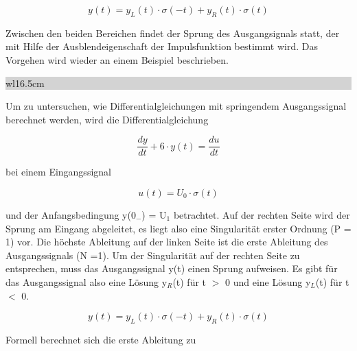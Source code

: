 \begin{equation}\label{eq:hundredseven}
y\left(t\right)=y_{L} \left(t\right)\cdot \sigma \left(-t\right)+y_{R} \left(t\right)\cdot \sigma \left(t\right)
\end{equation}

\noindent Zwischen den beiden Bereichen findet der Sprung des Ausgangsignals statt, der mit Hilfe der Ausblendeigenschaft der Impulsfunktion bestimmt wird. Das Vorgehen wird wieder an einem Beispiel beschrieben.\bigskip

\noindent
\colorbox{lightgray}{%
%
\renewcommand\arraystretch{0.6}%
\begin{tabular}{ wl{16.5cm} }
{\selectfont{
Beispiel: Lineare Differentialgleichung und stetiges Ausgangssignal}}
\end{tabular}%
}\bigskip

\noindent Um zu untersuchen, wie Differentialgleichungen mit springendem Ausgangssignal berechnet werden, wird die Differentialgleichung

\begin{equation}\label{eq:hundredeight}
\frac{dy}{dt} +6\cdot y\left(t\right)=\frac{du}{dt}
\end{equation}

\noindent bei einem Eingangssignal 

\begin{equation}\label{eq:hundrednine}
u\left(t\right)=U_{0} \cdot \sigma \left(t\right)
\end{equation}

\noindent und der Anfangsbedingung y(0${}_{-}$) = U${}_{1}$ betrachtet. Auf der rechten Seite wird der Sprung am Eingang abgeleitet, es liegt also eine Singularit\"{a}t erster Ordnung (P = 1) vor. Die h\"{o}chste Ableitung auf der linken Seite ist die erste Ableitung des Ausgangssignals (N =1). Um der Singularit\"{a}t auf der rechten Seite zu entsprechen, muss das Ausgangssignal y(t) einen Sprung aufweisen. Es gibt f\"{u}r das Ausgangssignal also eine L\"{o}sung y${}_{R}$(t) f\"{u}r t $\mathrm{>}$ 0 und eine L\"{o}sung y${}_{L}$(t) f\"{u}r t $\mathrm{<}$ 0. 

\begin{equation}\label{eq:hundredten}
y\left(t\right)=y_{L} \left(t\right)\cdot \sigma \left(-t\right)+y_{R} \left(t\right)\cdot \sigma \left(t\right)
\end{equation}

\noindent Formell berechnet sich die erste Ableitung zu

